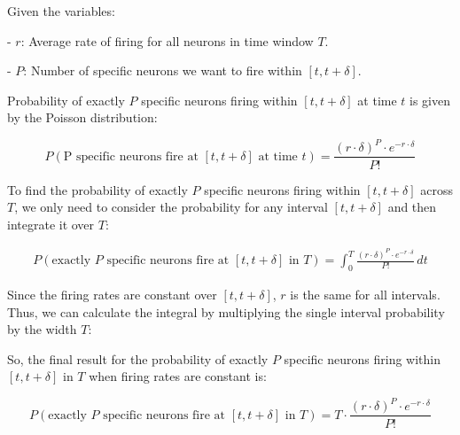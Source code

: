 Given the variables:


- \( r \): Average rate of firing for all neurons in time window \( T \).

- \( P \): Number of specific neurons we want to fire within \([t, t + \delta]\).

Probability of exactly \( P \) specific neurons firing within \([t, t + \delta]\) at time \( t \) is given by the Poisson distribution:

\begin{equation}
P(\text{P specific neurons fire at } [t, t + \delta] \text{ at time } t) = \frac{{(r \cdot \delta)^P \cdot e^{-r \cdot \delta}}}{{P!}}
\end{equation}

To find the probability of exactly \( P \) specific neurons firing within \([t, t + \delta]\) across \( T \), we only need to consider the probability for any interval \([t, t + \delta]\) and then integrate it over \( T \):

\begin{equation}
\begin{aligned}
    P(\text{exactly } P \text{ specific neurons fire at } [t, t + \delta] \text{ in } T) =    \int_{0}^{T} \frac{{(r \cdot \delta)^P \cdot e^{-r \cdot \delta}}}{{P!}} \, dt
\end{aligned}
\end{equation}

Since the firing rates are constant over \([t, t + \delta]\), \( r \) is the same for all intervals. Thus, we can calculate the integral by multiplying the single interval probability by the width \( T \):

So, the final result for the probability of exactly \( P \) specific neurons firing within \([t, t + \delta]\) in \( T \) when firing rates are constant is:

\begin{equation}
P(\text{exactly } P \text{ specific neurons fire at } [t, t + \delta] \text{ in } T) = T \cdot \frac{{(r \cdot \delta)^P \cdot e^{-r \cdot \delta}}}{{P!}}
\end{equation}